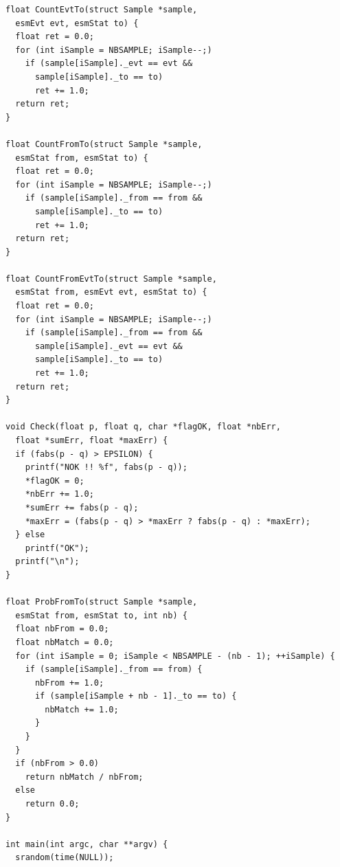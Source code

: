 \documentclass[12pt, a4paper]{article}
\begin{document}
\begin{scriptsize}
\begin{ttfamily}
\begin{lstlisting}
float CountEvtTo(struct Sample *sample, 
  esmEvt evt, esmStat to) {
  float ret = 0.0;
  for (int iSample = NBSAMPLE; iSample--;)
    if (sample[iSample]._evt == evt &&
      sample[iSample]._to == to)
      ret += 1.0;
  return ret;
}

float CountFromTo(struct Sample *sample, 
  esmStat from, esmStat to) {
  float ret = 0.0;
  for (int iSample = NBSAMPLE; iSample--;)
    if (sample[iSample]._from == from &&
      sample[iSample]._to == to)
      ret += 1.0;
  return ret;
}

float CountFromEvtTo(struct Sample *sample, 
  esmStat from, esmEvt evt, esmStat to) {
  float ret = 0.0;
  for (int iSample = NBSAMPLE; iSample--;)
    if (sample[iSample]._from == from &&
      sample[iSample]._evt == evt &&
      sample[iSample]._to == to)
      ret += 1.0;
  return ret;
}

void Check(float p, float q, char *flagOK, float *nbErr, 
  float *sumErr, float *maxErr) {
  if (fabs(p - q) > EPSILON) {
    printf("NOK !! %f", fabs(p - q));
    *flagOK = 0;
    *nbErr += 1.0;
    *sumErr += fabs(p - q);
    *maxErr = (fabs(p - q) > *maxErr ? fabs(p - q) : *maxErr);
  } else
    printf("OK");
  printf("\n");
}

float ProbFromTo(struct Sample *sample, 
  esmStat from, esmStat to, int nb) {
  float nbFrom = 0.0;
  float nbMatch = 0.0;
  for (int iSample = 0; iSample < NBSAMPLE - (nb - 1); ++iSample) {
    if (sample[iSample]._from == from) {
      nbFrom += 1.0;
      if (sample[iSample + nb - 1]._to == to) {
        nbMatch += 1.0;
      }
    }
  }
  if (nbFrom > 0.0)
    return nbMatch / nbFrom;
  else
    return 0.0;
}

int main(int argc, char **argv) {
  srandom(time(NULL));
  

\end{lstlisting}
\end{ttfamily}
\end{scriptsize}
\end{document}

